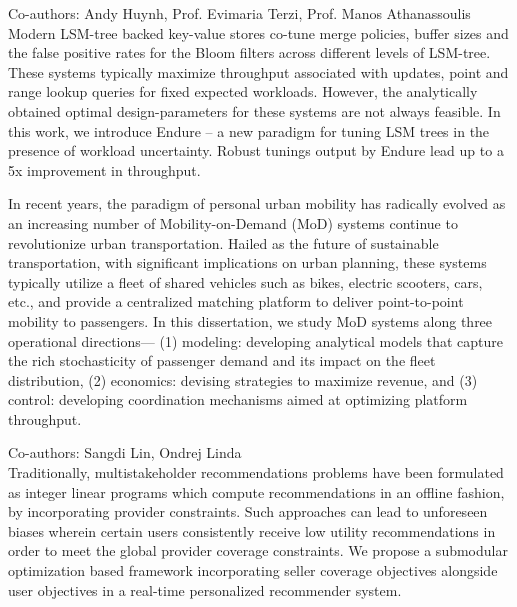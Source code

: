\documentclass[10pt]{moderncv}
\begin{document}
{
    Co-authors: Andy Huynh, Prof. Evimaria Terzi, Prof. Manos Athanassoulis\\
    Modern LSM-tree backed key-value stores co-tune merge policies, buffer sizes and the false positive rates for the 
        Bloom filters across different levels of LSM-tree. 
    These systems typically maximize throughput associated with updates, point and range lookup queries for fixed 
        expected workloads. 
    However, the analytically obtained optimal design-parameters for these systems are not always feasible. 
    In this work, we introduce Endure -- a new paradigm for tuning LSM trees in the presence of workload uncertainty. 
    Robust tunings output by Endure lead up to a 5x improvement in throughput.
}

{
    In recent years, the paradigm of personal urban mobility has radically evolved as an increasing number of 
        Mobility-on-Demand (MoD) systems continue to revolutionize urban transportation. 
    Hailed as the future of sustainable transportation, with significant implications on urban planning, these systems 
        typically utilize a fleet of shared vehicles such as bikes, electric scooters, cars, etc., and provide a 
        centralized matching platform to deliver point-to-point mobility to passengers. 
    In this dissertation, we study MoD systems along three operational directions—
    (1) modeling: developing analytical models that capture the rich stochasticity of passenger demand and its impact 
        on the fleet distribution,
    (2) economics: devising strategies to maximize revenue, and (3) control: developing coordination mechanisms aimed 
        at optimizing platform throughput.
}

{
    Co-authors: Sangdi Lin, Ondrej Linda\\
    Traditionally, multistakeholder recommendations problems have been formulated as integer linear programs which 
        compute recommendations in an offline fashion, by incorporating provider constraints.
    Such approaches can lead to unforeseen biases wherein certain users consistently receive low utility 
        recommendations in order to meet the global provider coverage constraints. 
    We propose a submodular optimization based framework incorporating seller coverage objectives alongside user 
        objectives in a real-time personalized recommender system.
}
\end{document}
